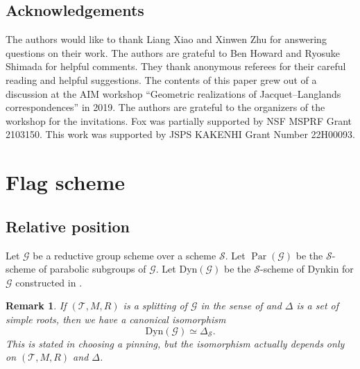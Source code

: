 \documentclass[12pt,a4paper]{article}
\newtheorem{rem}[thm]{Remark}
\DeclareMathOperator{\Par}{Par}
\newcommand{\sG}{\mathscr{G}}
\newcommand{\sS}{\mathscr{S}}
\newcommand{\sT}{\mathscr{T}}
\begin{document}
\subsection*{Acknowledgements}
The authors would like to thank Liang Xiao and Xinwen Zhu for answering questions on their work. The authors are grateful to Ben Howard and Ryosuke Shimada for helpful comments. They thank anonymous referees for their careful reading and helpful suggestions. 
The contents of this paper grew out of a discussion at the AIM workshop 
``Geometric realizations of Jacquet--Langlands correspondences'' in 2019. 
The authors are grateful to the organizers of the workshop for the invitations. Fox was partially supported by NSF MSPRF Grant 2103150. 
This work was supported by JSPS KAKENHI Grant Number 22H00093. 

\section{Flag scheme}\label{sec:fla}
\subsection{Relative position}
Let $\sG$ be a reductive group scheme over a scheme $\sS$. 
Let $\Par (\sG)$ be the $\sS$-scheme of parabolic subgroups of $\sG$. Let 
$\mathrm{Dyn}(\sG)$ be the $\sS$-scheme of Dynkin for $\sG$ 
constructed in \cite[XXIV, 3.3]{SGA3-3}. 
\begin{rem}
If $(\sT,M,R)$ is a splitting of $\sG$ in the sense of 
\cite[XXII, D\'efinition 1.13]{SGA3-3} and 
$\Delta$ is a set of simple roots, 
then we have a canonical isomorphism 
\begin{equation}\label{eq:DynDel}
 \mathrm{Dyn}(\sG) \simeq \Delta_{\sS} . 
\end{equation}
This is stated in \cite[XXIV, 3.4 (iii)]{SGA3-3} 
choosing a pinning, 
but the isomorphism actually depends only on 
$(\sT,M,R)$ and $\Delta$. 
\end{rem}
\end{document}
